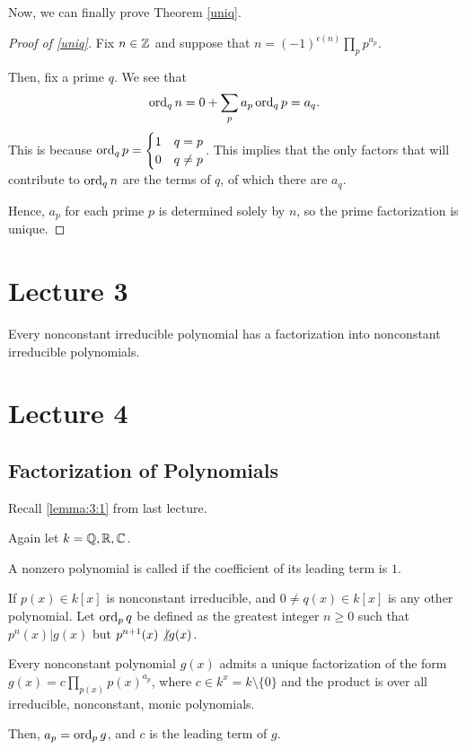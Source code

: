 \documentclass{article}
\begin{document}
Now, we can finally prove Theorem \ref{uniq}.
\begin{proof}[Proof of \ref{uniq}]
    Fix $n \in \mathbb Z$ and suppose that $n = (-1)^{\epsilon(n)} \prod_{p} p^{a_p}$.

    Then, fix a prime $q$. We see that \[\operatorname{ord}_{q} n = 0 + \sum_{p}a_p \operatorname{ord}_q p = a_q.\] This is because $\operatorname{ord}_q p = \begin{cases}1 & q = p \\ 0 & q \neq p\end{cases}$. This implies that the only factors that will contribute to $\operatorname{ord}_q n$ are the terms of $q$, of which there are $a_q$.

    Hence, $a_p$ for each prime $p$ is determined solely by $n$, so the prime factorization is unique.
\end{proof}

\section{Lecture 3}

\begin{lemma}
    \label{lemma:3:1}
    Every nonconstant irreducible polynomial has a factorization into nonconstant irreducible polynomials.
\end{lemma}

\section{Lecture 4}
\subsection{Factorization of Polynomials}
Recall \ref{lemma:3:1} from last lecture.

Again let $k = \mathbb Q, \mathbb R, \mathbb C$. 

\begin{definition}
    A nonzero polynomial is called  if the coefficient of its leading term is $1$.
\end{definition}

\begin{definition}
    If $p(x) \in k[x]$ is nonconstant irreducible, and $0 \neq q(x) \in k[x]$ is any other polynomial. Let $\operatorname{ord}_p q$ be defined as the greatest integer $n \geq 0$ such that $p^n(x) \vert g(x)$ but $p^{n+1}(x) \not \vert g(x)$.
\end{definition}

\begin{theorem}
    \label{polyfac}
    Every nonconstant polynomial $g(x)$ admits a unique factorization of the form $g(x) = c \prod_{p(x)} p(x)^{a_p}$, where $c \in k^x = k \setminus \{0\}$ and the product is over all irreducible, nonconstant, monic polynomials.

    Then, $a_p = \operatorname{ord}_p g$, and $c$ is the leading term of $g$.
\end{theorem}
\end{document}
